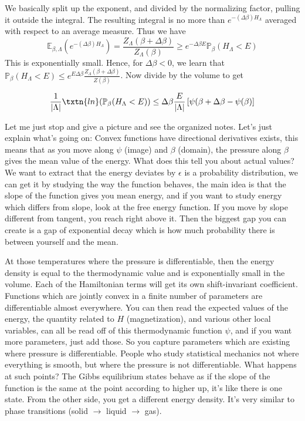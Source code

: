 We basically split up the exponent, and divided by the normalizing factor, pulling it outside the integral. The resulting integral is no more than $e^{-(\Delta\beta)H_{\Lambda}}$ averaged with respect to an average measure. 
Thus we have 
\[
\mathbb{E}_{\beta, \Lambda}(e^{-(\Delta\beta)H_{\Lambda}}) = \frac{Z_{\Lambda}(\beta + \Delta\beta)}{Z_{\Lambda}(\beta)} \geq e^{-\Delta\beta E}\mathbb{P}_{\beta}(H_{\Lambda} < E)
\]
This is exponentially small. Hence, for $\Delta\beta < 0$, we learn that $\mathbb{P}_{\beta}(H_{\Lambda} < E) \leq e^{E\Delta \beta} \frac{Z_{\Lambda}(\beta + \Delta \beta)}{Z(\beta)}$. Now divide by the volume to get

\[
\frac{1}{|\Lambda|} \txtn{ln}(\mathbb{P}_{\beta}(H_{\Lambda} < E)) \leq \Delta\beta \frac{E}{|\Lambda|}\left[ \psi(\beta + \Delta\beta - \psi(\beta)\right]
\]

Let me just stop and give a picture and see the organized notes. Let's just explain what's going on: Convex functions have directional derivatives exists, this means that as you move along $\psi$ (image) and $\beta$ (domain), the pressure along $\beta$ gives the mean value of the energy. What does this tell you about actual values? We want to extract that the energy deviates by $\epsilon$ is a probability distribution, we can get it by studying the way the function behaves, the main idea is that the slope of the function gives you mean energy, and if you want to study energy which differs from slope, look at the free energy function. If you move by slope different from tangent, you reach right above it. Then the biggest gap you can create is a gap of exponential decay which is how much probability there is between yourself and the mean. 

At those temperatures where the pressure is differentiable, then the energy density is equal to the thermodynamic value and is exponentially small in the volume. Each of the Hamiltonian terms will get its own shift-invariant coefficient. Functions which are jointly convex in a finite number of parameters are differentiable almost everywhere. You can then read the expected values of the energy, the quantity related to $H$ (magnetization), and various other local variables, can all be read off of this thermodynamic function $\psi$, and if you want more parameters, just add those. So you capture parameters which are existing where pressure is differentiable. People who study statistical mechanics not where everything is smooth, but where the pressure is not differentiable. What happens at such points? The Gibbs equilibrium states behave as if the slope of the function is the same at the point according to higher up, it's like there is one state. From the other side, you get a different energy density. It's very similar to phase transitions (solid $\to$ liquid $\to$ gas). 

